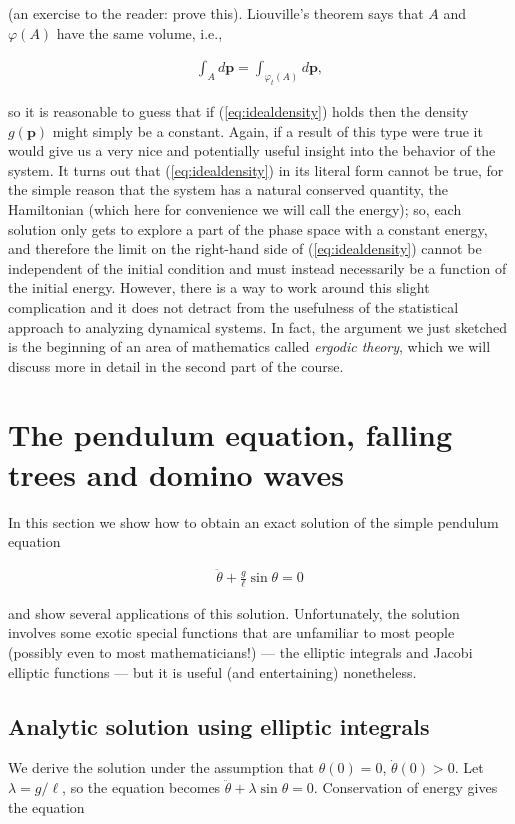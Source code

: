 \documentclass[11pt]{report}
\theoremstyle{plain}
\theoremstyle{definition}
\begin{document}
(an exercise to the reader: prove this). Liouville's
theorem says that $A$ and $\varphi(A)$ have the same
volume, i.e.,

\begin{align*}
\int_A d\mathbf{p} = \int_{\varphi_t(A)} d\mathbf{p},
\end{align*}

so it is reasonable to guess that if
(\ref{eq:idealdensity}) holds then the density
$g(\mathbf{p})$ might simply be a constant. Again, if
a result of this type were true it would give us a
very nice and potentially useful insight into the
behavior of the system. It turns out that
(\ref{eq:idealdensity}) in its literal form cannot be
true, for the simple reason that the system has a
natural conserved quantity, the Hamiltonian (which
here for convenience we will call the energy); so,
each solution only gets to explore a part of the phase
space with a constant energy, and therefore the limit
on the right-hand side of (\ref{eq:idealdensity}) cannot
be independent of the initial condition and must
instead necessarily be a function of the initial
energy. However, there is a way to work around this
slight complication and it does not detract from the
usefulness of the statistical approach to analyzing
dynamical systems. In fact, the argument we just
sketched is the beginning of an area of mathematics
called \emph{ergodic theory}, which we will discuss more in
detail in the second part of the course.

\section{The pendulum equation, falling trees and domino waves}
In this section we show how to obtain an exact
solution of the simple pendulum equation

\begin{align*}
\ddot{\theta} + \frac{g}{\ell} \sin \theta = 0
\end{align*}

and show several applications of this solution.
Unfortunately, the solution involves some exotic
special functions that are unfamiliar to most people
(possibly even to most mathematicians!) --- the
elliptic integrals and Jacobi elliptic functions ---
but it is useful (and entertaining) nonetheless.

\subsection{Analytic solution using elliptic integrals}
We derive the solution under the assumption that
$\theta(0) = 0$, $\dot{\theta}(0)>0$. Let
$\lambda=g/\ell$, so the equation becomes
$\ddot{\theta}+\lambda \sin \theta=0$. Conservation
of energy gives the equation
\end{document}
